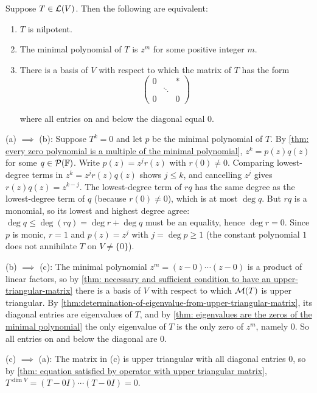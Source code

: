 \begin{thm}
  \label{thm: minimal polynomial and upper-triangular matrix of nilpotent operator}
  Suppose $T \in \mathcal{L}(V)$. Then the following are equivalent:
  \begin{enumerate}[label=\textbf{(\alph*)}]
    \item $T$ is nilpotent.
    \item The minimal polynomial of $T$ is $z^m$ for some positive integer $m$.
    \item There is a basis of $V$ with respect to which the matrix of $T$ has the form
    \begin{equation}
      \begin{pmatrix}
        0 &        & * \\
          & \ddots &   \\
        0 &        & 0
      \end{pmatrix}
    \end{equation}

    where all entries on and below the diagonal equal $0$.
  \end{enumerate}
\end{thm}
\begin{prf}
  \StepOne (a) $\implies$ (b): Suppose $T^k = 0$ and let $p$ be the minimal polynomial of $T$. By \ref{thm: every zero polynomial is a multiple of the minimal polynomial}, $z^k = p(z) q(z)$ for some $q \in \mathcal{P}(\mathbb{F})$. Write $p(z) = z^j r(z)$ with $r(0) \neq 0$. Comparing lowest-degree terms in $z^k = z^j r(z) q(z)$ shows $j \leq k$, and cancelling $z^j$ gives $r(z) q(z) = z^{k-j}$. The lowest-degree term of $rq$ has the same degree as the lowest-degree term of $q$ (because $r(0) \neq 0$), which is at most $\deg q$. But $rq$ is a monomial, so its lowest and highest degree agree: $\deg q \leq \deg (rq) = \deg r + \deg q$ must be an equality, hence $\deg r = 0$. Since $p$ is monic, $r = 1$ and $p(z) = z^j$ with $j = \deg p \geq 1$ (the constant polynomial $1$ does not annihilate $T$ on $V \neq \{0\}$).

  \StepTwo (b) $\implies$ (c): The minimal polynomial $z^m = (z - 0) \cdots (z - 0)$ is a product of linear factors, so by \ref{thm: necessary and sufficient condition to have an upper-triangular-matrix} there is a basis of $V$ with respect to which $\mathcal{M}(T)$ is upper triangular. By \ref{thm:determination-of-eigenvalue-from-upper-triangular-matrix}, its diagonal entries are eigenvalues of $T$, and by \ref{thm: eigenvalues are the zeros of the minimal polynomial} the only eigenvalue of $T$ is the only zero of $z^m$, namely $0$. So all entries on and below the diagonal are $0$.

  \StepThree (c) $\implies$ (a): The matrix in (c) is upper triangular with all diagonal entries $0$, so by \ref{thm: equation satisfied by operator with upper triangular matrix}, $T^{\dim V} = (T - 0I) \cdots (T - 0I) = 0$.
\end{prf}
